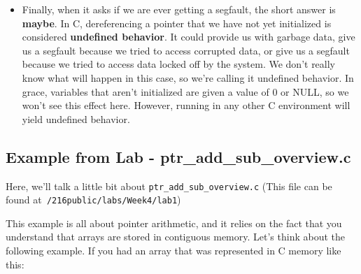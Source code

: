 \documentclass[english, 10pt]{article}
\begin{document}
\begin{itemize}
	\item Finally, when it asks if we are ever getting a segfault, the short answer is \textbf{maybe}. In C, dereferencing a pointer that we have not yet initialized is considered \textbf{undefined behavior}. It could provide us with garbage data, give us a segfault because we tried to access corrupted data, or give us a segfault because we tried to access data locked off by the system. We don't really know what will happen in this case, so we're calling it undefined behavior. In grace, variables that aren't initialized are given a value of 0 or NULL, so we won't see this effect here. However, running in any other C environment will yield undefined behavior.
\end{itemize}

\subsection{Example from Lab - ptr\_add\_sub\_overview.c}

Here, we'll talk a little bit about \texttt{ptr\_add\_sub\_overview.c} \newline (This file can be found at\texttt{~/216public/labs/Week4/lab1}) \newline

This example is all about pointer arithmetic, and it relies on the fact that you understand that arrays are stored in contiguous memory. Let's think about the following example. If you had an array that was represented in C memory like this:\newline\newline
\end{document}
